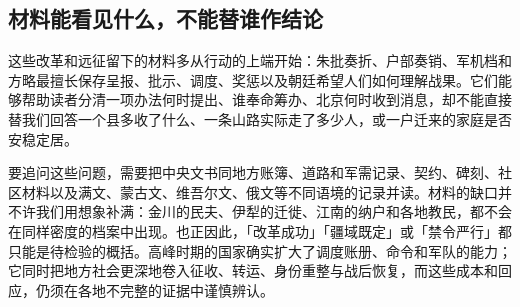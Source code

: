 \subsection{材料能看见什么，不能替谁作结论}

这些改革和远征留下的材料多从行动的上端开始：朱批奏折、户部奏销、军机档和方略最擅长保存呈报、批示、调度、奖惩以及朝廷希望人们如何理解战果。它们能够帮助读者分清一项办法何时提出、谁奉命筹办、北京何时收到消息，却不能直接替我们回答一个县多收了什么、一条山路实际走了多少人，或一户迁来的家庭是否安稳定居。

要追问这些问题，需要把中央文书同地方账簿、道路和军需记录、契约、碑刻、社区材料以及满文、蒙古文、维吾尔文、俄文等不同语境的记录并读。材料的缺口并不许我们用想象补满：金川的民夫、伊犁的迁徙、江南的纳户和各地教民，都不会在同样密度的档案中出现。也正因此，「改革成功」「疆域既定」或「禁令严行」都只能是待检验的概括。高峰时期的国家确实扩大了调度账册、命令和军队的能力；它同时把地方社会更深地卷入征收、转运、身份重整与战后恢复，而这些成本和回应，仍须在各地不完整的证据中谨慎辨认。
